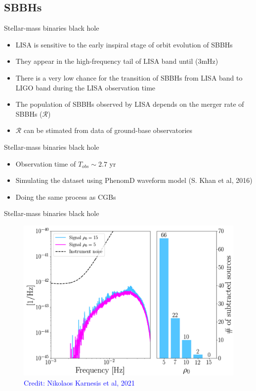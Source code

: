 \documentclass[pdf]{beamer}
\newcommand{\credit}[1]{\tiny{\textcolor{blue}{Credit: #1}}}
\begin{document}
\subsection{SBBHs}
\begin{frame}{Stellar-mass binaries black hole}
\begin{itemize}
\item LISA is sensitive to the early inspiral stage of orbit evolution of SBBHs
\item They appear in the high-frequency tail of LISA band until ($3\mathrm{mHz}$)
\item There is a very low chance for the transition of SBBHs from LISA band to LIGO band during the LISA observation time
\item The population of SBBHs observed by LISA depends on the merger rate of SBBHs ($\mathcal{R}$)
\item $\mathcal{R}$ can be stimated from data of ground-base observatories
\end{itemize}
\end{frame}

\begin{frame}{Stellar-mass binaries black hole}
\begin{itemize}
\item Observation time of $T_{obs} \sim 2.7$ yr
\item Simulating the dataset using PhenomD waveform model (S. Khan et al, 2016)
\item Doing the same process as CGBs
\end{itemize}
\end{frame}

\begin{frame}{Stellar-mass binaries black hole}
\begin{figure}
\includegraphics[width=.8\textwidth]{fig/SMBHs.png}
\caption*{\credit{Nikolaos Karnesis et al, 2021}}
\end{figure}
\end{frame}
\end{document}
